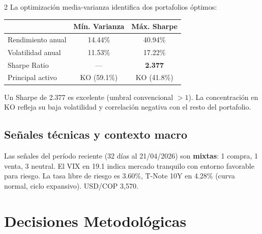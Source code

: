 \documentclass[10pt,a4paper]{article}
\begin{document}
\begin{multicols}{2}
La optimización media-varianza identifica dos portafolios óptimos:

{\footnotesize
\begin{tabular}{@{}lcc@{}}
\toprule
 & \textbf{Mín. Varianza} & \textbf{Máx. Sharpe} \\
\midrule
Rendimiento anual & 14.44\% & 40.94\% \\
Volatilidad anual & 11.53\% & 17.22\% \\
Sharpe Ratio      & ---     & \textbf{2.377} \\
Principal activo  & KO (59.1\%)& KO (41.8\%) \\
\bottomrule
\end{tabular}
}

\vspace{4pt}
Un Sharpe de 2.377 es excelente (umbral convencional $>1$). La concentración en KO refleja su baja volatilidad y correlación negativa con el resto del portafolio.

\subsection{Señales técnicas y contexto macro}

Las señales del período reciente (32 días al 21/04/2026) son \textbf{mixtas}: 1 compra, 1 venta, 3 neutral. El VIX en 19.1 indica mercado tranquilo con entorno favorable para riesgo. La tasa libre de riesgo es 3.60\%, T-Note 10Y en 4.28\% (curva normal, ciclo expansivo). USD/COP 3,570.

\end{multicols}

\section{Decisiones Metodológicas}
\end{document}
